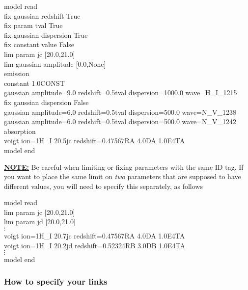 \vspace{0.3cm}
\begin{mdframed}[style=MyFrame]
model read\\
fix gaussian redshift True\\
fix param tval True\\
fix gaussian dispersion True\\
fix constant value False\\
lim param jc [20.0,21.0]\\
lim gaussian amplitude [0.0,None]\\
emission\\
constant 1.0CONST\\
gaussian amplitude=9.0 redshift=0.5tval dispersion=1000.0 wave=H\_I\_1215\\
fix gaussian dispersion False\\
gaussian amplitude=6.0 redshift=0.5tval dispersion=500.0 wave=N\_V\_1238\\
gaussian amplitude=6.0 redshift=0.5tval dispersion=500.0 wave=N\_V\_1242\\
absorption\\
voigt ion=1H\_I    20.5jc   redshift=0.47567RA    4.0DA   1.0E4TA\\
model end
\end{mdframed}
\vspace{0.2cm}

\textbf{\underline{NOTE:}} Be careful when limiting or fixing
parameters with the same ID tag. If you want to place the same
limit on \textit{two} parameters that are supposed to have different
values, you will need to specify this separately, as follows

\vspace{0.3cm}
\begin{mdframed}[style=MyFrame]
model read\\
lim param jc [20.0,21.0]\\
lim param jd [20.0,21.0]\\
$\vdots$\\
voigt ion=1H\_I    20.7jc   redshift=0.47567RA    4.0DA   1.0E4TA\\
voigt ion=1H\_I    20.2jd   redshift=0.52324RB    3.0DB   1.0E4TA\\
$\vdots$\\
model end
\end{mdframed}
\vspace{0.2cm}

\subsubsection{How to specify your links}
\label{sec:specifylinks}

